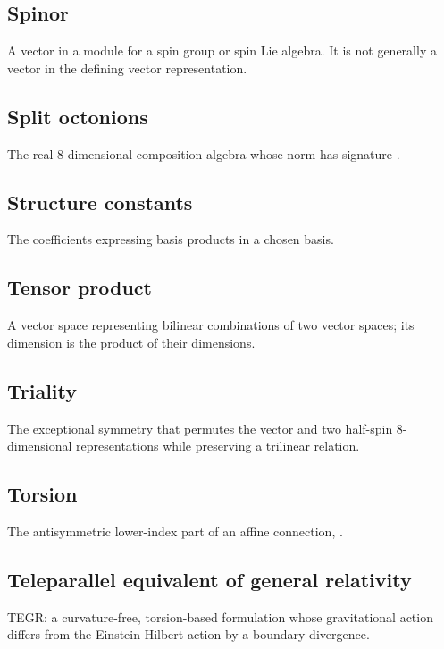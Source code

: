 \documentclass[11pt]{article}
\begin{document}
\subsection{Spinor}

A vector in a module for a spin group or spin Lie algebra. It is not generally a vector in the defining vector representation.

\subsection{Split octonions}

The real 8-dimensional composition algebra whose norm has signature \texttt{}.

\subsection{Structure constants}

The coefficients \texttt{} expressing basis products in a chosen basis.

\subsection{Tensor product}

A vector space representing bilinear combinations of two vector spaces; its dimension is the product of their dimensions.

\subsection{Triality}

The exceptional \texttt{} symmetry that permutes the vector and two half-spin 8-dimensional representations while preserving a trilinear relation.

\subsection{Torsion}

The antisymmetric lower-index part of an affine connection, \texttt{}.

\subsection{Teleparallel equivalent of general relativity}

TEGR: a curvature-free, torsion-based formulation whose gravitational action differs from the Einstein-Hilbert action by a boundary divergence.
\end{document}
